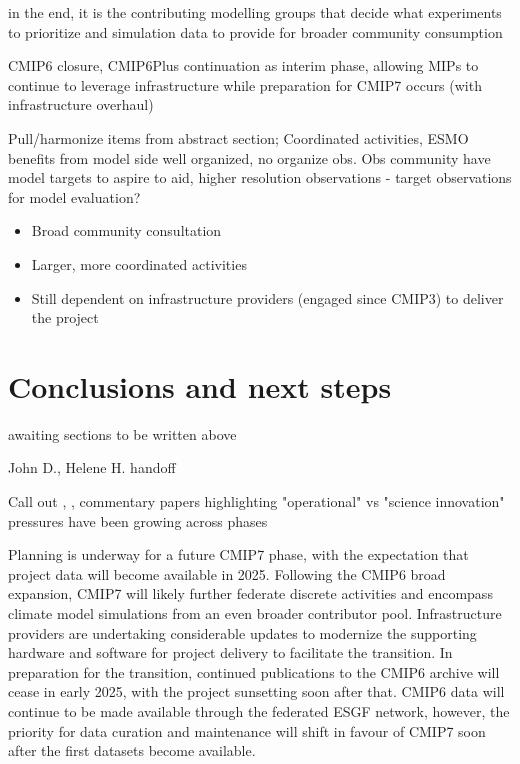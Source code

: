 \documentclass[gmd, preprint]{copernicus}
\def\cred#1{{\color{red}#1}}
\begin{document}
in the end, it is the contributing modelling groups that decide what experiments to prioritize and simulation data to provide for broader community consumption

\cred{
CMIP6 closure, CMIP6Plus continuation as interim phase, allowing MIPs to continue to leverage infrastructure while preparation for CMIP7 occurs (with infrastructure overhaul)
}

\cred{Pull/harmonize items from abstract section; Coordinated activities, ESMO benefits from model side well organized, no organize obs. Obs community have model targets to aspire to aid, higher resolution observations - target observations for model evaluation?}


\cred{
\begin{itemize}
	\item Broad community consultation
	\item Larger, more coordinated activities
	\item Still dependent on infrastructure providers (engaged since CMIP3) to deliver the project
\end{itemize}
}


\section{Conclusions and next steps} %
\label{sec:Conclusions}
\cred{awaiting sections to be written above}

\cred{John D., Helene H. handoff}

\cred{Call out \citet{shukla_strategies_2009,shukla_toward_2010}, \citep{jakob_need_2023}, \citep{stevens_perspective_2024} commentary papers highlighting "operational" vs "science innovation" pressures have been growing across phases}

Planning is underway for a future CMIP7 phase, with the expectation that project data will become available in 2025. Following the CMIP6 broad expansion, CMIP7 will likely further federate discrete activities and encompass climate model simulations from an even broader contributor pool. Infrastructure providers are undertaking considerable updates to modernize the supporting hardware and software for project delivery to facilitate the transition. In preparation for the transition, continued publications to the CMIP6 archive will cease in early 2025, with the project sunsetting soon after that. CMIP6 data will continue to be made available through the federated ESGF network, however, the priority for data curation and maintenance will shift in favour of CMIP7 soon after the first datasets become available.
\end{document}
